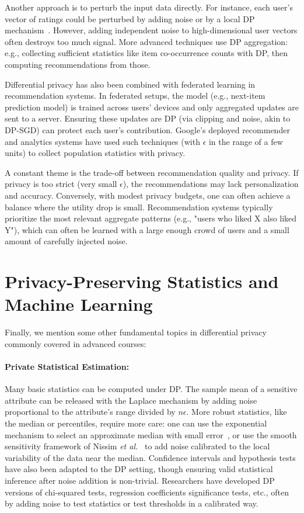 \documentclass[11pt]{article}
\theoremstyle{remark}
\theoremstyle{definition}
\theoremstyle{plain}
\begin{document}
Another approach is to perturb the input data directly. For instance, each user’s vector of ratings could be perturbed by adding noise or by a local DP mechanism~\cite{McSherry2009}. However, adding independent noise to high-dimensional user vectors often destroys too much signal. More advanced techniques use DP aggregation: e.g., collecting sufficient statistics like item co-occurrence counts with DP, then computing recommendations from those.

Differential privacy has also been combined with federated learning in recommendation systems. In federated setups, the model (e.g., next-item prediction model) is trained across users’ devices and only aggregated updates are sent to a server. Ensuring these updates are DP (via clipping and noise, akin to DP-SGD) can protect each user's contribution. Google’s deployed recommender and analytics systems have used such techniques (with $\epsilon$ in the range of a few units) to collect population statistics with privacy.

A constant theme is the trade-off between recommendation quality and privacy. If privacy is too strict (very small $\epsilon$), the recommendations may lack personalization and accuracy. Conversely, with modest privacy budgets, one can often achieve a balance where the utility drop is small. Recommendation systems typically prioritize the most relevant aggregate patterns (e.g., "users who liked X also liked Y"), which can often be learned with a large enough crowd of users and a small amount of carefully injected noise.

\section{Privacy-Preserving Statistics and Machine Learning}

Finally, we mention some other fundamental topics in differential privacy commonly covered in advanced courses:

\paragraph{Private Statistical Estimation:} Many basic statistics can be computed under DP. The sample mean of a sensitive attribute can be released with the Laplace mechanism by adding noise proportional to the attribute's range divided by $n\epsilon$. More robust statistics, like the median or percentiles, require more care: one can use the exponential mechanism to select an approximate median with small error~\cite{McSherry2007}, or use the smooth sensitivity framework of Nissim \textit{et al.}~\cite{Nissim2007} to add noise calibrated to the local variability of the data near the median. Confidence intervals and hypothesis tests have also been adapted to the DP setting, though ensuring valid statistical inference after noise addition is non-trivial. Researchers have developed DP versions of chi-squared tests, regression coefficients significance tests, etc., often by adding noise to test statistics or test thresholds in a calibrated way.
\end{document}
